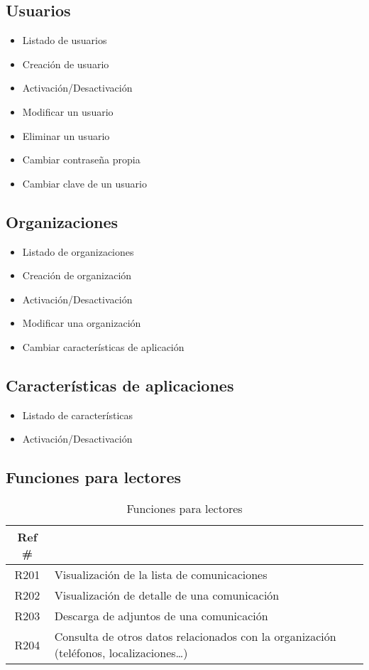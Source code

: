 \subsection{Usuarios}
\begin{itemize}
  \item Listado de usuarios
  \item Creación de usuario
  \item Activación/Desactivación
  \item Modificar un usuario
  \item Eliminar un usuario
  \item Cambiar contraseña propia
  \item Cambiar clave de un usuario
\end{itemize}

\subsection{Organizaciones}
\begin{itemize}
  \item Listado de organizaciones
  \item Creación de organización
  \item Activación/Desactivación
  \item Modificar una organización
  \item Cambiar características de aplicación
\end{itemize}

\subsection{Características de aplicaciones}
\begin{itemize}
  \item Listado de características
  \item Activación/Desactivación
\end{itemize}


\subsection{Funciones para lectores}
\begin{table}[ht]
    \centering
    \begin{tabularx}{\textwidth}{|cX|}
    \rowcolor[HTML]{9B9B9B} 
    {\color[HTML]{FFFFFF} Ref \#} &
      \multicolumn{1}{l}{\cellcolor[HTML]{9B9B9B}{\color[HTML]{FFFFFF} Función}} \\ \hline
    R201\label{R201} & Visualización de la lista de comunicaciones \\
    R202\label{R202} & Visualización de detalle de una comunicación \\
    R203\label{R203} & Descarga de adjuntos de una comunicación \\ 
    R204\label{R204} & Consulta de otros datos relacionados con la organización (teléfonos, localizaciones\dots) \\
    \hline
    \end{tabularx}
    \caption{Funciones para lectores}
    \label{cuadro:funciones-lectores }
\end{table}


